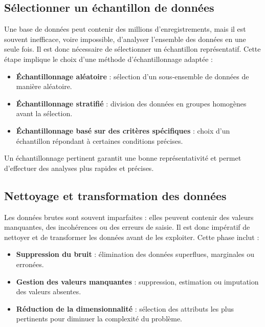 \documentclass[a4paper,12pt]{report}
\begin{document}
     \subsection{Sélectionner un échantillon de données}
         Une base de données peut contenir des millions d’enregistrements, mais il est souvent inefficace, voire impossible, d’analyser l’ensemble des données en une seule fois. Il est donc nécessaire de sélectionner un échantillon représentatif. Cette étape implique le choix d’une méthode d’échantillonnage adaptée :
    
         \begin{itemize}
             \item \textbf{Échantillonnage aléatoire} : sélection d’un sous-ensemble de données de manière aléatoire.
        
             \item \textbf{Échantillonnage stratifié} : division des données en groupes homogènes avant la sélection.
        
             \item \textbf{Échantillonnage basé sur des critères spécifiques} : choix d’un échantillon répondant à certaines conditions précises.
         \end{itemize}
    
        Un échantillonnage pertinent garantit une bonne représentativité et permet d’effectuer des analyses plus rapides et précises.

     \subsection{Nettoyage et transformation des données}

         Les données brutes sont souvent imparfaites : elles peuvent contenir des valeurs manquantes, des incohérences ou des erreurs de saisie. Il est donc impératif de nettoyer et de transformer les données avant de les exploiter. Cette phase inclut :
         \begin{itemize}
             \item \textbf{Suppression du bruit} : élimination des données superflues, marginales ou erronées.
    
            \item \textbf{Gestion des valeurs manquantes} : suppression, estimation ou imputation des valeurs absentes.
    
             \item \textbf{Réduction de la dimensionnalité} : sélection des attributs les plus pertinents pour diminuer la complexité du problème.
         \end{itemize}
         
\end{document}
